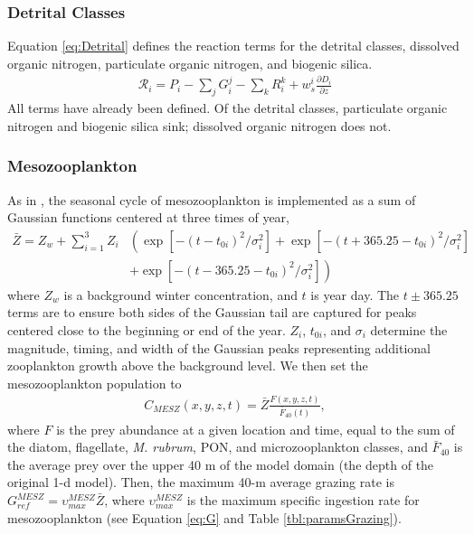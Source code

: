 \documentclass[draft,jgrga]{agutexSI2019}
\begin{document}
\begin{article}
\subsubsection*{Detrital Classes}
Equation \ref{eq:Detrital} defines the reaction terms for the detrital classes, dissolved organic nitrogen, particulate organic nitrogen, and biogenic silica. 
\begin{align}
  \mathcal{R}_i =P_i-\sum_jG_i^j-\sum_{k}R_i^k+w_s^i\frac{\partial D_i}{\partial z}
\label{eq:Detrital}
\end{align}
All terms have already been defined. 
Of the detrital classes, particulate organic nitrogen and biogenic silica sink; dissolved organic nitrogen does not.

\subsubsection*{Mesozooplankton}
As in , the seasonal cycle of mesozooplankton is implemented as a sum of Gaussian functions centered at three times of year,
\begin{align}
\label{eq:MZbar}
  \bar{Z} = Z_{w} + \sum_{i=1}^3 Z_{i} & \left( \exp[-(t-t_{0i})^2/\sigma _i ^2]  +\exp[-(t+365.25-t_{0i})^2/\sigma _i^2]  \right. \nonumber \\ 
  	        				&  + \left. \exp[-(t-365.25-t_{0i})^2/\sigma _i^2]  \right)
\end{align}
where $Z_w$ is a background winter concentration, and $t$ is year day. 
The $t\pm365.25$ terms are to ensure both sides of the Gaussian tail are captured for peaks centered close to the beginning or end of the year.  
$Z_{i}$, $t_{0i}$, and $\sigma _i$ determine the magnitude, timing, 
and width of the Gaussian peaks representing additional zooplankton growth above the background level. 
We then set the mesozooplankton population to 
\begin{align}
\label{eq:MZ}
   C_{MESZ}(x,y,z,t) = \bar{Z} \frac{F(x,y,z,t)}{\bar{F}_{40}(t)},
\end{align}
where $F$ is the prey abundance at a given location and time, 
equal to the sum of the diatom, flagellate, \textit{M. rubrum}, PON, and microzooplankton classes, 
and $\bar{F}_{40}$ is the average prey over the upper 40 m of the model domain (the depth of the original 1-d model). 
Then, the maximum 40-m average grazing rate is $G_{ref}^{MESZ}=\upsilon_{max}^{MESZ}\bar{Z}$, 
where $\upsilon_{max}^{MESZ}$ is the maximum specific ingestion rate for mesozooplankton (see Equation \ref{eq:G} and Table \ref{tbl:paramsGrazing}).


\end{article}
\end{document}
